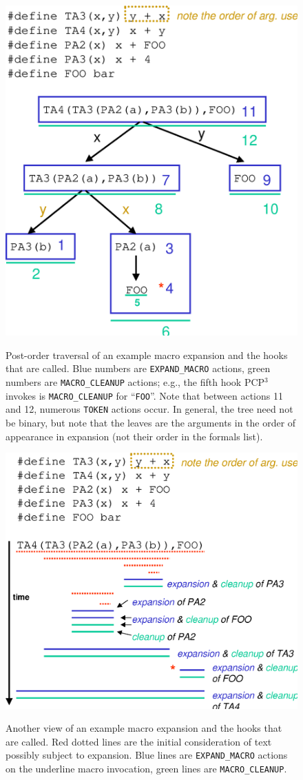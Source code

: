 \documentclass{article}
\newcommand{\pcp}{\mbox{\textsf{PCP}$^3$}}
\newcommand{\eg}{e.g.,}
\begin{document}
\begin{figure}[p]
  \begin{center}
    \leavevmode
    \includegraphics[width=0.5\linewidth]{figs/tree-expn.eps}
    \label{fig:tree-expn}
    \caption{Post-order traversal of an example macro expansion and the
      hooks that are called. Blue numbers are \texttt{EXPAND\_MACRO}
      actions, green numbers are \texttt{MACRO\_CLEANUP} actions; \eg{}
      the fifth hook \pcp{} invokes is \texttt{MACRO\_CLEANUP} for
        ``\texttt{FOO}''.  Note that between actions 11 and 12, numerous
        \texttt{TOKEN} actions occur.  In general, the tree need not be
      binary, but note that the leaves are the arguments in the order of
      appearance in expansion (not their order in the formals list).}
  \end{center}
\end{figure}

\begin{figure}[p]
  \begin{center}
    \leavevmode
    \includegraphics[width=0.5\linewidth]{figs/text-expn.eps}
    \label{fig:text-expn}
    \caption{Another view of an example macro expansion and the hooks
    that are called.  Red dotted lines are the initial consideration of
    text possibly subject to expansion.  Blue lines are
    \texttt{EXPAND\_MACRO} actions on the underline macro invocation,
    green lines are \texttt{MACRO\_CLEANUP}.}
  \end{center}
\end{figure}
\end{document}
